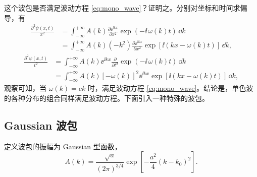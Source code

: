 这个波包是否满足波动方程 \eqref{eq:mono_wave}？证明之。分别对坐标和时间求偏导，有
\begin{align*}
    \frac{\partial^2\psi(x,t)}{x^2} 
    &= \int_{-\infty}^{+\infty} A(k) \frac{\partial \ee^{\ii kx}}{\partial x^2} \exp(-\ii\,\omega(k) t) \,\dd k \\ 
    &= \int_{-\infty}^{+\infty} A(k) (-k^2) \frac{\partial \ee^{\ii kx}}{\partial x^2} \exp[\ii(kx - \omega(k)t)] \,\dd k,
\end{align*}
\begin{align*}
    \frac{\partial^2\psi(x,t)}{t^2} 
    &= \int_{-\infty}^{+\infty} A(k) \ee^{\ii kx} \frac{\partial}{\partial t^2}\exp(-\ii\,\omega(k) t) \,\dd k \\ 
    &= \int_{-\infty}^{+\infty} A(k) \left[-\omega(k)\right]^2 \ee^{\ii kx} \exp[\ii(kx - \omega(k)t)] \,\dd k, 
\end{align*}
观察可知，当 $\omega(k) = ck$ 时，满足波动方程 \eqref{eq:mono_wave}。结论是，单色波的各种分布的组合同样满足波动方程。下面引入一种特殊的波包。


\subsection{Gaussian 波包}

定义波包的振幅为 Gaussian 型函数，
\begin{equation}
    A(k) = \frac{\sqrt{a}}{(2 \pi)^{3/4}} \exp \left[ - \frac{a^2}{4} (k - k_0)^2 \right]. \label{eq:wp_gaussian_def}
\end{equation}

